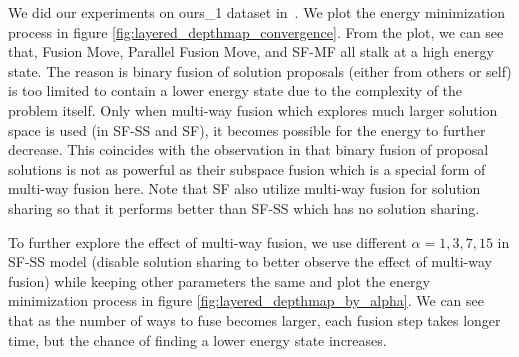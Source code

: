 We did our experiments on ours\_1 dataset in~\cite{layered_depthmap}. We plot the energy minimization process in figure \ref{fig:layered_depthmap_convergence}. From the plot, we can see that, Fusion Move, Parallel Fusion Move, and SF-MF all stalk at a high energy state. The reason is binary fusion of solution proposals (either from others or self) is too limited to contain a lower energy state due to the complexity of the problem itself. Only when multi-way fusion which explores much larger solution space is used (in SF-SS and SF), it becomes possible for the energy to further decrease. This coincides with the observation in \cite{layered_depthmap} that binary fusion of proposal solutions is not as powerful as their subspace fusion which is a special form of multi-way fusion here. Note that SF also utilize multi-way fusion for solution sharing so that it performs better than SF-SS which has no solution sharing.

To further explore the effect of multi-way fusion, we use different $\alpha = {1, 3, 7, 15}$ in SF-SS model (disable solution sharing to better observe the effect of multi-way fusion) while keeping other parameters the same and plot the energy minimization process in figure \ref{fig:layered_depthmap_by_alpha}. We can see that as the number of ways to fuse becomes larger, each fusion step takes longer time, but the chance of finding a lower energy state increases.


